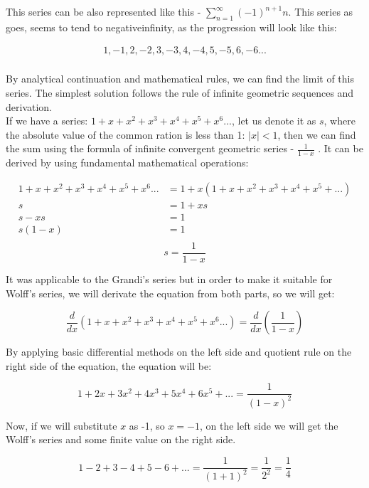 \documentclass[a4paper]{article}
\begin{document}
This series can be also represented like this - $\sum_{n=1}^\infty (-1)^{n+1}n$. This series as goes, seems to tend to negativeinfinity,
as the progression will look like this:

\begin{align*}
1, -1, 2, -2, 3, -3, 4, -4, 5, -5, 6, -6...\\
\end{align*}

By analytical continuation and mathematical rules, we can find the limit of this series. The simplest
solution follows the rule of infinite geometric sequences and derivation.\\

If we have a series: $1+x+x^2+x^3+x^4+x^5+x^6...$, let us denote it as $s$, where the absolute value of the common
ration is less than 1: $|x| < 1$, then we can find the sum using the formula of infinite convergent
geometric series - $\frac{1}{1-x}$ . It can be derived by using fundamental mathematical operations:

\begin{align*}
  1+x+x^2+x^3+x^4+x^5+x^6...&=1+x(1+x+x^2+x^3+x^4+x^5+...)\\
  s&=1+xs\\
  s-xs&=1\\
  s(1-x)&=1\\
\end{align*}
\begin{equation}
  s=\frac{1}{1-x}
  \end{equation}

It was applicable to the Grandi's series but in order to make it suitable for Wolff's series, we will
derivate the equation from both parts, so we will get:

\begin{equation*}
  \frac{d}{dx}(1+x+x^2+x^3+x^4+x^5+x^6...)=\frac{d}{dx}(\frac{1}{1-x})
  \end{equation*}

By applying basic differential methods on the left side and quotient rule on the right side of the
equation, the equation will be:

\begin{equation*}
  1+2x+3x^2+4x^3+5x^4+6x^5+...=\frac{1}{(1-x)^2}
  \end{equation*}

Now, if we will substitute $x$ as -1, so $x = − 1$, on the left side we will get the Wolff's series and
some finite value on the right side.

\begin{equation}
  1-2+3-4+5-6+...=\frac{1}{(1+1)^2}=\frac{1}{2^2}=\frac{1}{4}
  \label{Wolff}
\end{equation}
\end{document}
